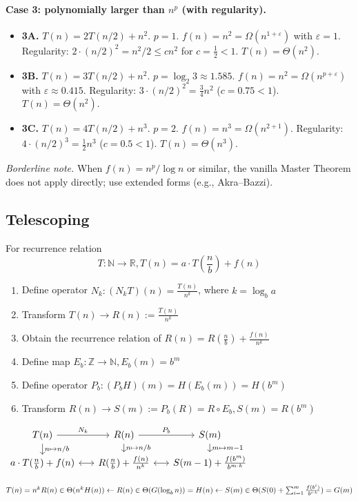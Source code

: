 \documentclass[9pt]{extarticle}
\begin{document}
    \paragraph{Case 3: polynomially larger than \(n^p\) (with regularity).}
    \begin{itemize}
      \item \textbf{3A.} \(T(n)=2T(n/2)+n^2\). \(p=1\). \(f(n)=n^2=\Omega(n^{1+\varepsilon})\) with \(\varepsilon=1\). Regularity: \(2\cdot(n/2)^2=n^2/2\le c n^2\) for \(c=\tfrac12<1\). \(\boxed{T(n)=\Theta(n^2)}\).
      \item \textbf{3B.} \(T(n)=3T(n/2)+n^2\). \(p=\log_2 3\approx1.585\). \(f(n)=n^2=\Omega(n^{p+\varepsilon})\) with \(\varepsilon\approx0.415\). Regularity: \(3\cdot(n/2)^2=\tfrac34 n^2\) (\(c=0.75<1\)). \(\boxed{T(n)=\Theta(n^2)}\).
      \item \textbf{3C.} \(T(n)=4T(n/2)+n^3\). \(p=2\). \(f(n)=n^3=\Omega(n^{2+1})\). Regularity: \(4\cdot(n/2)^3=\tfrac12 n^3\) (\(c=0.5<1\)). \(\boxed{T(n)=\Theta(n^3)}\).
    \end{itemize}
    
    \noindent\textit{Borderline note.} When \(f(n)=n^p/\log n\) or similar, the vanilla Master Theorem does not apply directly; use extended forms (e.g., Akra--Bazzi).
    



\subsection{Telescoping}
For recurrence relation 
\[T: \mathbb{N} \rightarrow \mathbb{R},T(n) = a\cdot T(\frac{n}{b}) + f(n)\]
\begin{enumerate}
    \item Define operator $N_k: (N_kT)(n) = \frac{T(n)}{n^k}$, where $k = \log_ba$
    \item Transform $T(n) \rightarrow R(n) := \frac{T(n)}{n^k}$
    \item Obtain the recurrence relation of $R(n) = R(\frac{n}{b}) + \frac{f(n)}{n^k}$
    \item Define map $E_b: \mathbb{Z} \rightarrow \mathbb{N}, E_b(m) = b^m$
    \item Define operator $P_b: (P_b H)(m) = H(E_b(m)) = H(b^m)$
    \item Transform $R(n) \rightarrow S(m) := P_b(R) = R \circ E_b, S(m) = R(b^m)$
\end{enumerate} 
    $
\begin{tikzcd}[row sep=small, column sep = tiny]
T(n) \arrow[r, "N_k"] \arrow[d, "n \mapsto n/b"] &[1em] R(n) \arrow[r, "P_b"] \arrow[d,"n \mapsto n/b"]&[1em] S(m) \arrow[d, "m \mapsto m-1"]\\
a\cdot T(\frac{n}{b}) + f(n) \arrow[r, <->] & R(\frac{n}{b}) + \frac{f(n)}{n^k} \arrow[r, <->]& S(m - 1) + \frac{f(b^m)}{b^{m\cdot k}} \\
\end{tikzcd}$\\
$T(n) = n^kR(n)\in \Theta(n^k H(n))\leftarrow R(n) \in \Theta(G(\log_bn)) = H(n) \\\leftarrow S(m) \in \Theta(S(0) + \sum_{i=1}^{m}\frac{f(b^i)}{b^{i\cdot k}}) = G(m)$
\end{document}

